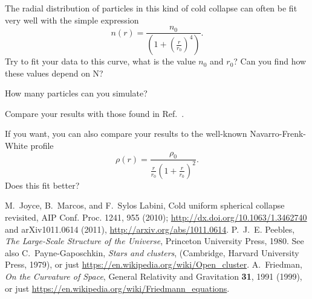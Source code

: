 \documentclass[11pt,a4wide]{article}
\begin{document}
\begin{enumerate}
The radial distribution of particles in this kind of cold collapse can often be fit very well with the simple expression 
\[ 
n(r) = \frac{n_0}{\left(1 +\left(\frac{r}{r_0}\right)^4\right)}.
\]
Try to fit your data to this curve, what is the value $n_0$ and $r_0$? Can you find how these values depend on N?

How many particles can you simulate?

Compare your results with those found in Ref.~\cite{joyce2010}. 

If you want, you can also compare your results to the well-known Navarro-Frenk-White profile
\[ 
\rho(r) = \frac{\rho_0}{\frac{r}{r_0}\left(1 +\frac{r}{r_0}\right)^2}.
\]
Does this fit better?

\end{enumerate}
\begin{thebibliography}{100} 
 M.~Joyce, B.~Marcos, and F.~Sylos Labini, Cold uniform spherical collapse revisited, AIP Conf. Proc. 1241, 955 (2010); \url{http://dx.doi.org/10.1063/1.3462740} and arXiv1011.0614 (2011), 
\url{http://arxiv.org/abs/1011.0614}.
 P.~J.~E. Peebles, \emph{{The Large-Scale Structure of the Universe}}, Princeton
  University Press, 1980. See also C.~Payne-Gaposchkin,  {\em Stars and clusters}, (Cambridge, Harvard University Press, 1979), or just \url{https://en.wikipedia.org/wiki/Open_cluster}. 
 A.~Friedman,  {\em On the Curvature of Space},  General Relativity and Gravitation {\bf 31},  1991 (1999), or just \url{https://en.wikipedia.org/wiki/Friedmann_equations}.
\end{thebibliography} 
\end{document}
